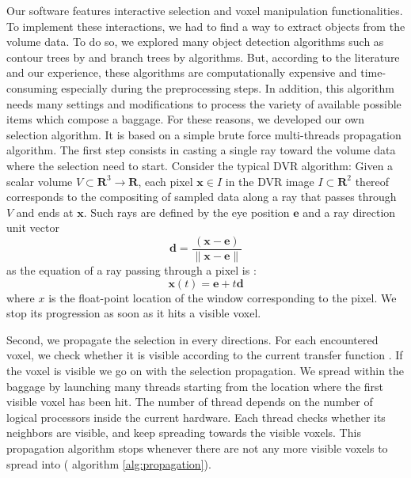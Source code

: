 Our software features interactive selection and voxel manipulation functionalities. To implement these interactions, we had to find a way to extract objects from the volume data. To do so, we explored many object detection algorithms such as contour trees by \cite{carr_computing_2000} and branch trees by \cite{pascucci_multi-resolution_2004} algorithms. But, according to the literature and our experience, these algorithms are computationally expensive and time-consuming especially during the preprocessing steps. In addition, this algorithm needs many settings and modifications to process the variety of available possible items which compose a baggage. For these reasons, we developed our own selection algorithm. It is based on a simple brute force multi-threads propagation algorithm. The first step consists in casting a single ray toward the volume data where the selection need to start.
Consider the typical DVR algorithm: Given a scalar volume $V \subset \mathbf{R}^3 \rightarrow \mathbf{R}$, each pixel $\mathbf{x} \in I$ in the DVR image $I \subset \mathbf{R}^2$ thereof corresponds to the compositing of sampled data along a ray that passes through $V$ and ends at $\mathbf{x}$. Such rays are defined by the eye position $\mathbf{e}$ and a ray direction unit vector
\begin{equation}
\mathbf{d} = \frac{ (\mathbf{x} - \mathbf{e}) }{ \| \mathbf{x} - \mathbf{e} \| }
\end{equation}
as the equation of a ray passing through a pixel is :
\begin{equation}
\mathbf{x}(t) =  \mathbf{e} + t\mathbf{d}
\end{equation}
where $x$ is the float-point location of the window corresponding to the pixel.
 We stop its progression as soon as it hits a visible voxel.



Second, we propagate the selection in every directions. For each encountered voxel, we check whether it is visible according to the current transfer function . If the voxel is visible we go on with the selection propagation. We spread within the baggage by launching many threads starting from the location where the first visible voxel has been hit. The number of thread depends on the number of logical processors inside the current hardware. Each thread checks whether its neighbors are visible, and keep spreading towards the visible voxels. This propagation algorithm stops whenever there are not any more visible voxels to spread into ( algorithm \autoref{alg:propagation}).

